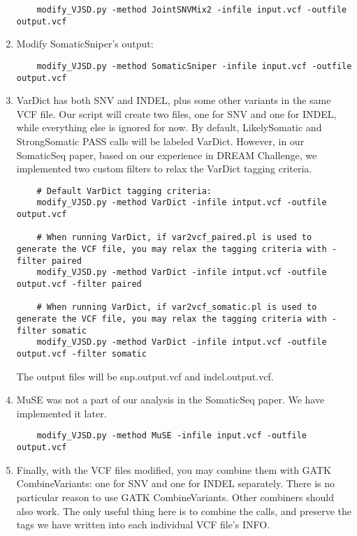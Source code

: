 \documentclass[10pt,letterpaper]{article}
\begin{document}
\begin{sloppypar}
\begin{enumerate}
	\begin{lstlisting}
	modify_VJSD.py -method JointSNVMix2 -infile input.vcf -outfile output.vcf
	\end{lstlisting}


	\item	
	Modify SomaticSniper's output:
	
	\begin{lstlisting}
	modify_VJSD.py -method SomaticSniper -infile input.vcf -outfile output.vcf
	\end{lstlisting}
	
	
	\item	
	VarDict has both SNV and INDEL, plus some other variants in the same VCF file. Our script will create two files, one for SNV and one for INDEL, while everything else is ignored for now. By default, LikelySomatic and StrongSomatic PASS calls will be labeled VarDict. However, in our SomaticSeq paper, based on our experience in DREAM Challenge, we implemented two custom filters to relax the VarDict tagging criteria. 
	
	\begin{lstlisting}
	# Default VarDict tagging criteria:
	modify_VJSD.py -method VarDict -infile intput.vcf -outfile output.vcf
	
	# When running VarDict, if var2vcf_paired.pl is used to generate the VCF file, you may relax the tagging criteria with -filter paired
	modify_VJSD.py -method VarDict -infile intput.vcf -outfile output.vcf -filter paired
	
	# When running VarDict, if var2vcf_somatic.pl is used to generate the VCF file, you may relax the tagging criteria with -filter somatic
	modify_VJSD.py -method VarDict -infile intput.vcf -outfile output.vcf -filter somatic
	\end{lstlisting}
	
	The output files will be snp.output.vcf and indel.output.vcf. 


	\item
	MuSE was not a part of our analysis in the SomaticSeq paper. We have implemented it later. 
	
	\begin{lstlisting}
	modify_VJSD.py -method MuSE -infile input.vcf -outfile output.vcf
	\end{lstlisting}

	\item
	Finally, with the VCF files modified, you may combine them with GATK CombineVariants: one for SNV and one for INDEL separately. There is no particular reason to use GATK CombineVariants. Other combiners should also work. The only useful thing here is to combine the calls, and preserve the tags we have written into each individual VCF file's INFO. 
	

\end{enumerate}
\end{sloppypar}
\end{document}
